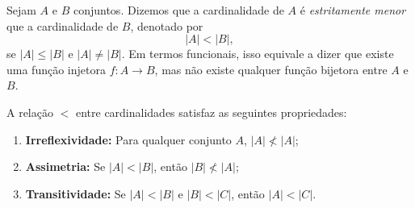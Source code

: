 \begin{definicao}
    \label{def:ordem_estrita_cardinal}
    Sejam \(A\) e \(B\) conjuntos. Dizemos que a cardinalidade de \(A\) é
    \emph{estritamente menor} que a cardinalidade de \(B\), denotado por
    \[
        |A| < |B|,
    \]
    se \(|A| \leq |B|\) e \(|A| \neq |B|\). Em termos funcionais, isso equivale a dizer que existe uma função injetora \(f: A \to B\), mas não existe qualquer função bijetora entre \(A\) e \(B\).
\end{definicao}

\begin{proposicao}
    \label{prop:ordem_estrita_propriedades}
    A relação \(<\) entre cardinalidades satisfaz as seguintes propriedades:
    \begin{enumerate}
        \item \textbf{Irreflexividade:} Para qualquer conjunto \(A\), \(|A| \not< |A|\);
        \item \textbf{Assimetria:} Se \(|A| < |B|\), então \(|B| \not< |A|\);
        \item \textbf{Transitividade:} Se \(|A| < |B|\) e \(|B| < |C|\), então \(|A| < |C|\).
    \end{enumerate}
\end{proposicao}

